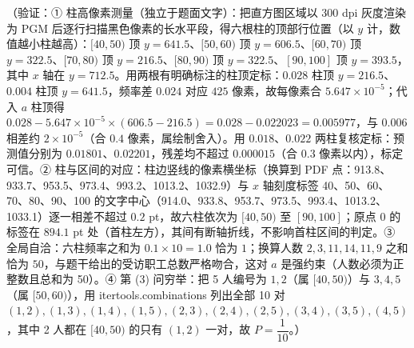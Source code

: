 \begin{answer}
（验证：① 柱高像素测量（独立于题面文字）：把直方图区域以 300 dpi 灰度渲染为 PGM 后逐行扫描黑色像素的长水平段，得六根柱的顶部行位置（以 \(y\) 计，数值越小柱越高）：\([40,50)\) 顶 \(y=641.5\)、\([50,60)\) 顶 \(y=606.5\)、\([60,70)\) 顶 \(y=322.5\)、\([70,80)\) 顶 \(y=216.5\)、\([80,90)\) 顶 \(y=322.5\)、\([90,100]\) 顶 \(y=393.5\)，其中 \(x\) 轴在 \(y=712.5\)。用两根有明确标注的柱顶定标：\(0.028\) 柱顶 \(y=216.5\)、\(0.004\) 柱顶 \(y=641.5\)，频率差 \(0.024\) 对应 \(425\) 像素，故每像素合 \(5.647\times10^{-5}\)；代入 \(a\) 柱顶得 \(0.028-5.647\times10^{-5}\times(606.5-216.5)=0.028-0.022023=0.005977\)，与 \(0.006\) 相差约 \(2\times10^{-5}\)（合 \(0.4\) 像素，属绘制舍入）。用 \(0.018\)、\(0.022\) 两柱复核定标：预测值分别为 \(0.01801\)、\(0.02201\)，残差均不超过 \(0.000015\)（合 \(0.3\) 像素以内），标定可信。② 柱与区间的对应：柱边竖线的像素横坐标（换算到 PDF 点：913.8、933.7、953.5、973.4、993.2、1013.2、1032.9）与 \(x\) 轴刻度标签 40、50、60、70、80、90、100 的文字中心（914.0、933.8、953.7、973.5、993.4、1013.2、1033.1）逐一相差不超过 \(0.2\) pt，故六柱依次为 \([40,50)\) 至 \([90,100]\)；原点 0 的标签在 \(894.1\) pt 处（首柱左方），其间有断轴折线，不影响首柱区间的判定。③ 全局自洽：六柱频率之和为 \(0.1\times10=1.0\) 恰为 \(1\)；换算人数 \(2,3,11,14,11,9\) 之和恰为 \(50\)，与题干给出的受访职工总数严格吻合，这对 \(a\) 是强约束（人数必须为正整数且总和为 50）。④ 第 (3) 问穷举：把 5 人编号为 \(1,2\)（属 \([40,50)\)）与 \(3,4,5\)（属 \([50,60)\)），用 itertools.combinations 列出全部 10 对 \((1,2),(1,3),(1,4),(1,5),(2,3),(2,4),(2,5),(3,4),(3,5),(4,5)\)，其中 2 人都在 \([40,50)\) 的只有 \((1,2)\) 一对，故 \(P=\dfrac{1}{10}\)。）




\end{answer}
